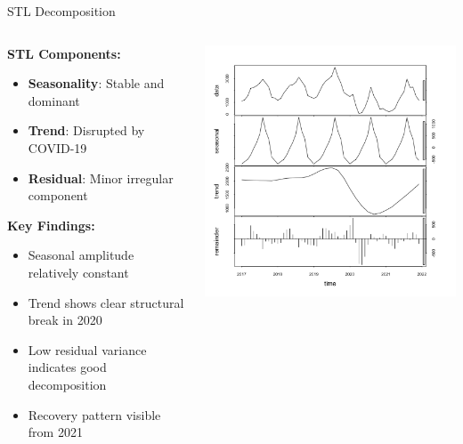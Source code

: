 \documentclass[10pt]{beamer}
\begin{document}
\begin{frame}{STL Decomposition}
\begin{columns}
\begin{column}{0.45\textwidth}
\textbf{STL Components:}
\begin{itemize}
\item \textbf{Seasonality}: Stable and dominant
\item \textbf{Trend}: Disrupted by COVID-19
\item \textbf{Residual}: Minor irregular component
\end{itemize}

\vspace{0.3cm}
\textbf{Key Findings:}
\begin{itemize}
\item Seasonal amplitude relatively constant
\item Trend shows clear structural break in 2020
\item Low residual variance indicates good decomposition
\item Recovery pattern visible from 2021
\end{itemize}
\end{column}

\begin{column}{0.55\textwidth}
\includegraphics[width=\textwidth,height=0.85\textheight,keepaspectratio]{plots/decomposition-stl.png}
\end{column}
\end{columns}
\end{frame}
\end{document}
